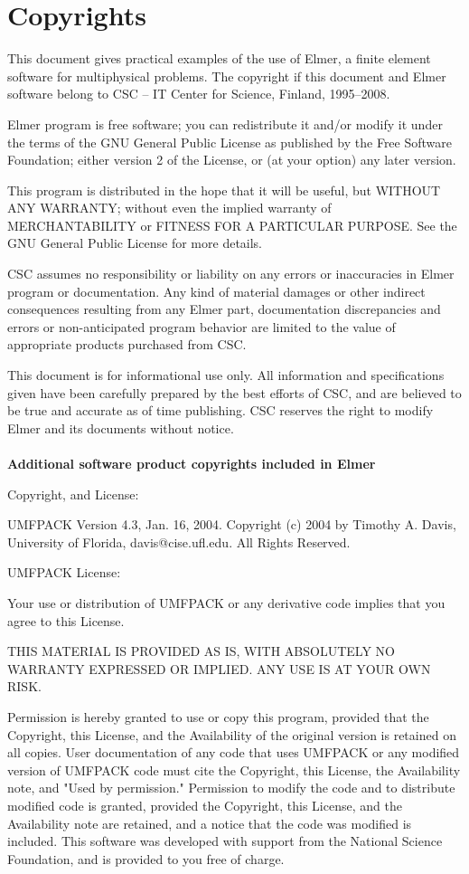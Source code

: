 \chapter*{Copyrights}

This document gives practical examples of the use of Elmer,
a finite element software for multiphysical problems.
The copyright if this document and Elmer software belong to
CSC -- IT Center for Science, Finland, 1995--2008. 

Elmer program is free software; you can redistribute it and/or
modify it under the terms of the GNU General Public License
as published by the Free Software Foundation; either version 2
of the License, or (at your option) any later version.

This program is distributed in the hope that it will be useful,
but WITHOUT ANY WARRANTY; without even the implied warranty of
MERCHANTABILITY or FITNESS FOR A PARTICULAR PURPOSE.  See the
GNU General Public License for more details.

CSC assumes no responsibility or liability on any errors or inaccuracies in 
Elmer program or documentation. Any kind of material damages or other indirect
consequences resulting from any Elmer part, documentation discrepancies and 
errors or non-anticipated program behavior are limited to the value of 
appropriate products purchased from CSC. 

This document is for informational use only. All information and specifications
given have been carefully prepared by the best efforts of CSC, and are believed
to be true and accurate as of time publishing. CSC reserves the right to 
modify Elmer and its documents without notice. \\  \mbox{} \\

\textbf{Additional software product copyrights included in Elmer}

Copyright, and License:

UMFPACK Version 4.3, Jan. 16, 2004. Copyright (c) 2004 by Timothy
A. Davis, University of Florida, davis@cise.ufl.edu. All Rights
Reserved. 


UMFPACK License: 

Your use or distribution of UMFPACK or any derivative code implies
that you agree to this License. 

      THIS MATERIAL IS PROVIDED AS IS, WITH ABSOLUTELY NO WARRANTY
      EXPRESSED OR IMPLIED. ANY USE IS AT YOUR OWN RISK. 

      Permission is hereby granted to use or copy this program,
      provided that the Copyright, this License, and the Availability
      of the original version is retained on all copies. User
      documentation of any code that uses UMFPACK or any modified
      version of UMFPACK code must cite the Copyright, this License,
      the Availability note, and "Used by permission." Permission to
      modify the code and to distribute modified code is granted,
      provided the Copyright, this License, and the Availability note
      are retained, and a notice that the code was modified is
      included. This software was developed with support from the
      National Science Foundation, and is provided to you free of
      charge. 

